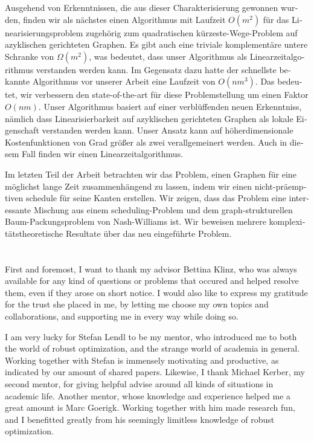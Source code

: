 \documentclass[twoside,openright,bibliography=totoc]{scrreprt}
\begin{document}
\begin{otherlanguage}{ngerman}
Ausgehend von Erkenntnissen, die aus dieser Charakterisierung gewonnen wurden, finden wir als nächstes einen Algorithmus mit Laufzeit $O(m^2)$ für das Linearisierungsproblem zugehörig zum quadratischen kürzeste-Wege-Problem auf azyklischen gerichteten Graphen. 
Es gibt auch eine triviale komplementäre untere Schranke von $\Omega(m^2)$, was bedeutet, dass unser Algorithmus als Linearzeitalgorithmus verstanden werden kann.
Im Gegensatz dazu hatte der schnellste bekannte Algorithmus vor unserer Arbeit eine Laufzeit von $O(nm^3)$. 
Das bedeutet, wir verbessern den state-of-the-art für diese Problemstellung um einen Faktor $O(nm)$. 
Unser Algorithmus basiert auf einer verblüffenden neuen Erkenntniss, nämlich dass Linearisierbarkeit auf azyklischen gerichteten Graphen als lokale Eigenschaft verstanden werden kann.
Unser Ansatz kann auf höherdimensionale Kostenfunktionen von Grad größer als zwei verallgemeinert werden. Auch in diesem Fall finden wir einen Linearzeitalgorithmus.


Im letzten Teil der Arbeit betrachten wir das Problem, einen Graphen für eine möglichst lange Zeit zusammenhängend zu lassen, indem wir einen nicht-präemptiven schedule für seine Kanten erstellen. Wir zeigen, dass das Problem eine interessante Mischung aus einem scheduling-Problem und dem graph-strukturellen Baum-Packungsproblem von Nash-Williams ist. Wir beweisen mehrere komplexitätstheoretische Resultate über das neu eingeführte Problem.


\end{otherlanguage}




\cleardoublepage

\chapter*{}

First and foremost, I want to thank my advisor Bettina Klinz, who was always available for any kind of questions or problems that occured and helped resolve them, even if they arose on short notice. I would also like to express my gratitude for the trust she placed in me, by letting me choose my own topics and collaborations, and supporting me in every way while doing so.

I am very lucky for Stefan Lendl to be my mentor, who introduced me to both the world of robust optimization, and the strange world of academia in general. Working together with Stefan is immensely motivating and productive, as indicated by our amount of shared papers. 
Likewise, I thank Michael Kerber, my second mentor, for giving helpful advise around all kinds of situations in academic life. 
Another mentor, whose knowledge and experience helped me a great amount is Marc Goerigk. Working together with him made research fun, and I benefitted greatly from his seemingly limitless knowledge of robust optimization.
\end{document}
